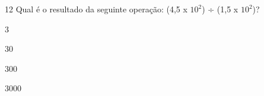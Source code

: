 

\num{12} Qual é o resultado da seguinte operação: (4,5 x $10^2$) ÷ (1,5 x $10^2$)?

\begin{escolha}
\item $3$
\item $30$
\item $300$
\item $3000$
\end{escolha}



